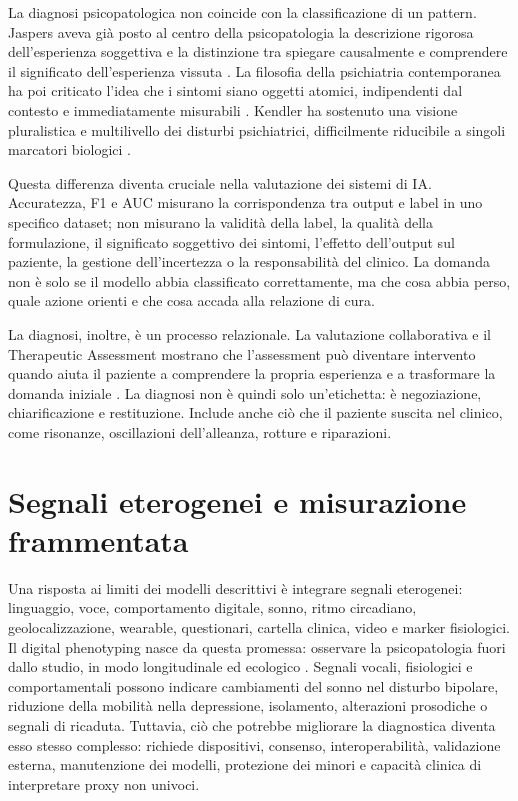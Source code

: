 \documentclass[utf8]{FrontiersinHarvard}
\begin{document}
La diagnosi psicopatologica non coincide con la classificazione di un pattern. Jaspers aveva gi\`a posto al centro della psicopatologia la descrizione rigorosa dell'esperienza soggettiva e la distinzione tra spiegare causalmente e comprendere il significato dell'esperienza vissuta \citep{jaspers1963,stanghellini2013}. La filosofia della psichiatria contemporanea ha poi criticato l'idea che i sintomi siano oggetti atomici, indipendenti dal contesto e immediatamente misurabili \citep{parnas2013,sass2011}. Kendler ha sostenuto una visione pluralistica e multilivello dei disturbi psichiatrici, difficilmente riducibile a singoli marcatori biologici \citep{kendler2011,kendler2012,kendler2016}.

Questa differenza diventa cruciale nella valutazione dei sistemi di \ac{IA}. Accuratezza, F1 e \ac{AUC} misurano la corrispondenza tra output e label in uno specifico dataset; non misurano la validit\`a della label, la qualit\`a della formulazione, il significato soggettivo dei sintomi, l'effetto dell'output sul paziente, la gestione dell'incertezza o la responsabilit\`a del clinico. La domanda non \`e solo se il modello abbia classificato correttamente, ma che cosa abbia perso, quale azione orienti e che cosa accada alla relazione di cura.

La diagnosi, inoltre, \`e un processo relazionale. La valutazione collaborativa e il Therapeutic Assessment mostrano che l'assessment pu\`o diventare intervento quando aiuta il paziente a comprendere la propria esperienza e a trasformare la domanda iniziale \citep{finn2007,finn2012,poston2010}. La diagnosi non \`e quindi solo un'etichetta: \`e negoziazione, chiarificazione e restituzione. Include anche ci\`o che il paziente suscita nel clinico, come risonanze, oscillazioni dell'alleanza, rotture e riparazioni.

\section{Segnali eterogenei e misurazione frammentata}
\label{sec:segnali}

Una risposta ai limiti dei modelli descrittivi \`e integrare segnali eterogenei: linguaggio, voce, comportamento digitale, sonno, ritmo circadiano, geolocalizzazione, wearable, questionari, cartella clinica, video e marker fisiologici. Il digital phenotyping nasce da questa promessa: osservare la psicopatologia fuori dallo studio, in modo longitudinale ed ecologico \citep{onnela2016,torous2017}. Segnali vocali, fisiologici e comportamentali possono indicare cambiamenti del sonno nel disturbo bipolare, riduzione della mobilit\`a nella depressione, isolamento, alterazioni prosodiche o segnali di ricaduta. Tuttavia, ci\`o che potrebbe migliorare la diagnostica diventa esso stesso complesso: richiede dispositivi, consenso, interoperabilit\`a, validazione esterna, manutenzione dei modelli, protezione dei minori e capacit\`a clinica di interpretare proxy non univoci.
\end{document}
